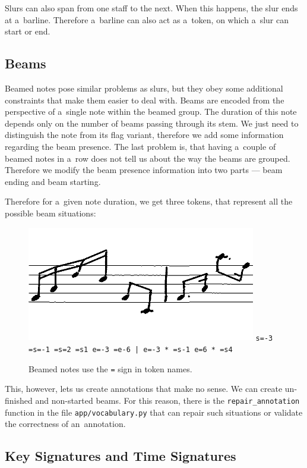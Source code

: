 Slurs can also span from one staff to the next. When this happens, the slur ends at a~barline. Therefore a~barline can also act as a~token, on which a~slur can start or end.


\subsection{Beams}

Beamed notes pose similar problems as slurs, but they obey some additional constraints that make them easier to deal with. Beams are encoded from the perspective of a~single note within the beamed group. The duration of this note depends only on the number of beams passing through its stem. We just need to distinguish the note from its flag variant, therefore we add some information regarding the beam presence. The last problem is, that having a~couple of beamed notes in a~row does not tell us about the way the beams are grouped. Therefore we modify the beam presence information into two parts --- beam ending and beam starting.

Therefore for a~given note duration, we get three tokens, that represent all the possible beam situations:

\begin{figure}[h]
    \centering
    \includegraphics[width=100mm]{../img/beams}
    \verb`s=-3 =s=-1 =s=2 =s1 e=-3 =e-6 | e=-3 * =s-1 e=6 * =s4`
    \caption{Beamed notes use the \texttt{=} sign in token names.}
    \label{fig4:Beams}
\end{figure}

This, however, lets us create annotations that make no sense. We can create un-finished and non-started beams. For this reason, there is the \verb`repair_`\allowbreak\verb`annotation` function in the file \verb`app/vocabulary.py` that can repair such situations or validate the correctness of an~annotation.


\subsection{Key Signatures and Time Signatures}

